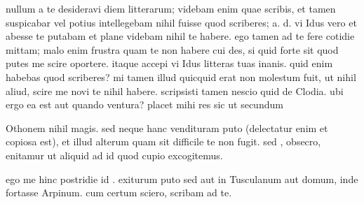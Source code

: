 


 nullum a te desideravi diem litterarum; videbam enim quae scribis, et tamen suspicabar vel potius intellegebam nihil fuisse quod scriberes; a. d. vi Idus vero et abesse te putabam et plane videbam nihil te habere. ego tamen ad te fere cotidie mittam; malo enim frustra quam te non habere cui des, si quid forte sit quod putes me scire oportere. itaque accepi vi Idus litteras tuas inanis. quid enim habebas quod scriberes? mi tamen illud quicquid erat non molestum fuit, ut nihil aliud, scire me novi te nihil habere. scripsisti tamen nescio quid de Clodia. ubi ergo ea est aut quando ventura? placet mihi res sic ut secundum

 Othonem nihil magis. sed neque hanc vendituram puto (delectatur enim et copiosa est), et illud alterum quam sit difficile te non fugit. sed , obsecro, enitamur ut aliquid ad id quod cupio excogitemus.

 ego me hinc postridie id . exiturum puto sed aut in Tusculanum aut domum, inde fortasse Arpinum. cum certum sciero, scribam ad te.
